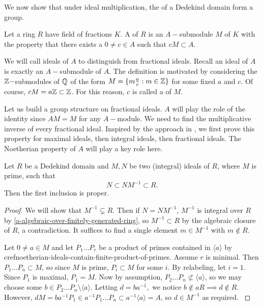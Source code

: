 We now show that under ideal multiplication, the  of a Dedekind domain form a group.

\begin{definition}
Let a ring $R$ have field of fractions $K$. A  of $R$ is an $A-$submodule $M$ of $K$ with the property that there exists a $0\neq c\in A$ such that $cM\subset A$.
\end{definition}

We will call ideals of $A$  to distinguish from fractional ideals. Recall an ideal of $A$ is exactly an $A-$submodule of $A$. The definition is motivated by considering the $\mathbb{Z}-$submodules of $\mathbb{Q}$ of the form $M=\{m\frac{a}{c}:m\in \mathbb{Z}\}$ for some fixed $a$ and $c$. Of course, $cM=a\mathbb{Z}\subset \mathbb{Z}$. For this reason, $c$ is called a  of $M$.

Let us build a group structure on fractional ideals. $A$ will play the role of the identity since $AM=M$ for any $A-$module. We need to find the multiplicative inverse of every fractional ideal. Inspired by the approach in \cite{Wright}, we first prove this property for maximal ideals, then integral ideals, then fractional ideals. The Noetherian property of $A$ will play a key role here.

\begin{lemma}\label{ideals-form-group-inclusion-lemma}
Let $R$ be a Dedekind domain and $M,N$ be two (integral) ideals of $R$, where $M$ is prime, such that
$$N\subset NM^{-1}\subset R.$$
Then the first inclusion is proper.
\end{lemma}
\begin{proof}
We will show that $M^{-1}\subsetneq R$. Then if $N=NM^{-1}$, $M^{-1}$ is integral over $R$ by \cref{a-algebraic-over-finitely-generated-ring}, so $M^{-1}\subset R$ by the algebraic closure of $R$, a contradiction. It suffices to find a single element $m\in M^{-1}$ with $m\not \in R.$

Let $0\neq a\in M$ and let $P_1\dots P_r$ be a product of primes contained in $\langle a \rangle$ by cref{noetherian-ideals-contain-finite-product-of-primes}. Assume $r$ is minimal. Then $P_1\dots P_n\subset M$, so since $M$ is prime, $P_i\subset M$ for some $i$. By relabeling, let $i=1$. Since $P_1$ is maximal, $P_1=M$. Now by assumption, $P_2\dots P_n\not \subset \langle a \rangle$, so we may choose some $b\in P_2\dots P_n\setminus \langle a \rangle$. Letting $d=ba^{-1},$ we notice $b\not \in aR\implies d\not \in R$. However, $dM=ba^{-1}P_1\in a^{-1}P_1\dots P_n\subset a^{-1}\langle a \rangle =A$, so $d\in M^{-1}$ as required.
\cite{Wright}
\end{proof}

